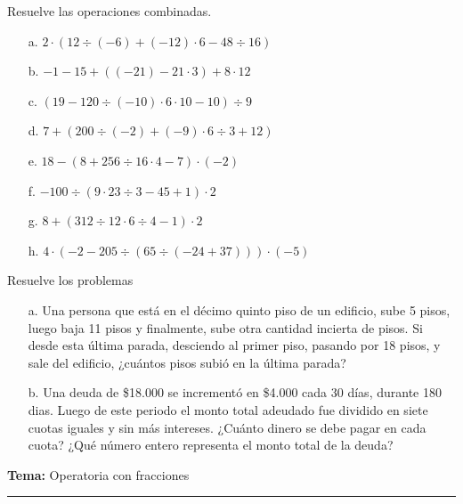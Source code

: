 \documentclass[spanish,letterpaper, 11pt, addpoints, answers]{exam}
\begin{document}
\begin{questions}
  \question Resuelve las operaciones combinadas.

  \begin{multicols}{2}
  \begin{itemize}
  \item[a.]$2\cdot \left( 12\div (-6)+(-12)\cdot 6-48\div 16\right)$
  \item[b.]$-1-15+\left((-21)-21\cdot 3\right) +8\cdot 12$
  \item[c.]$\left( 19-120\div (-10)\cdot 6\cdot 10-10\right) \div 9$
  \item[d.]$7+\left( 200\div (-2)+(-9)\cdot 6\div 3+12\right)$
  \item[e.]$18-\left( 8+256\div 16\cdot 4-7\right) \cdot(-2)$
  \item[f.] $-100\div \left( 9\cdot 23\div 3- 45+1\right) \cdot 2$
  \item[g.] $8 + \left( 312\div 12\cdot 6\div  4-1\right) \cdot 2$
  \item[h.] $4\cdot \left( -2-205\div \left(65\div \left(-24+37\right)\right)\right) \cdot (-5)$
  \end{itemize}

\end{multicols}

  \question Resuelve los problemas

  \begin{itemize}
  \item[a. ] Una persona que está en el décimo quinto piso de un edificio, sube 5 pisos, luego baja 11 pisos y finalmente, sube otra cantidad incierta de pisos. Si desde esta última parada, desciendo al primer piso, pasando por 18 pisos, y sale del edificio, ¿cuántos pisos subió en la última parada?
  \item[b. ] Una deuda de \$18.000 se incrementó en \$4.000 cada 30 días, durante 180 dias. Luego de este periodo el monto total adeudado fue dividido en siete cuotas iguales y sin más intereses. ¿Cuánto dinero se debe pagar en cada cuota? ¿Qué número entero representa el monto total de la deuda?
  \end{itemize}
  \newpage

  \parbox{6in}{
    \textbf{Tema:} Operatoria con fracciones}
    \vspace{0.15in}
    \hrule
    

\end{questions}
\end{document}
